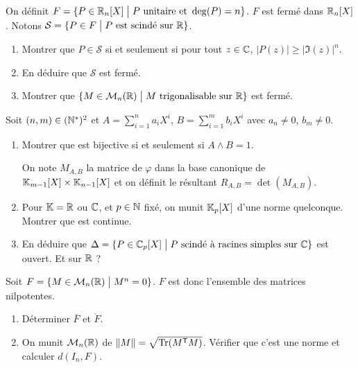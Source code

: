 \documentclass[12pt]{article}
\begin{document}
\begin{exercise}
	On définit $F=\{P\in\mathbb{R}_n[X]\bigm| P\text{ unitaire et }\deg(P)=n\}$. $F$ est fermé dans $\mathbb{R}_{n}[X]$. Notons $\mathcal{S}=\{P\in F\bigm| P\text{ est scindé sur }\mathbb{R}\}$.
	\begin{enumerate}
		\item Montrer que $P\in\mathcal{S}$ si et seulement si pour tout $z\in\mathbb{C}$, $\vert P(z)\vert\geqslant \vert\Im(z)\vert^{n}$.
		\item En déduire que $\mathcal{S}$ est fermé.
		\item Montrer que $\{M\in\mathcal{M}_{n}(\mathbb{R})\bigm| M\text{ trigonalisable sur }\mathbb{R}\}$ est fermé.
	\end{enumerate}
\end{exercise}

\begin{exercise}
	Soit $(n,m)\in(\mathbb{N}^{*})^{2}$ et $A=\sum_{i=1}^{n}a_{i}X^{i}$, $B=\sum_{i=1}^{m}b_{i}X^{i}$ avec $a_{n}\neq 0$, $b_{m}\neq0$.
	\begin{enumerate}
		\item Montrer que 
		est bijective si et seulement si $A\wedge B=1$.

		On note $M_{A,B}$ la matrice de $\varphi$ dans la base canonique de $\mathbb{K}_{m-1}[X]\times\mathbb{K}_{n-1}[X]$ et on définit le résultant $R_{A,B}=\det(M_{A,B})$.
		\item Pour $\mathbb{K}=\mathbb{R}$ ou $\mathbb{C}$, et $p\in\mathbb{N}$ fixé, on munit $\mathbb{K}_{p}[X]$ d'une norme quelconque. Montrer que 
		est continue.
		\item En déduire que $\Delta=\{P\in\mathbb{C}_{p}[X]\bigm| P\text{ scindé à racines simples sur }\mathbb{C}\}$ est ouvert. Et sur $\mathbb{R}$ ?
	\end{enumerate}
\end{exercise}

\begin{exercise}
	Soit $F=\{M\in\mathcal{M}_{n}(\mathbb{R})\bigm|M^{n}=0\}$. $F$ est donc l'ensemble des matrices nilpotentes.
	\begin{enumerate}
		\item Déterminer $\overline{F}$ et $\mathring{F}$.
		\item On munit $\mathcal{M}_{n}(\mathbb{R})$ de $\Vert M\Vert=\sqrt{\operatorname{Tr}(M^{\mathsf{T}}M)}$. Vérifier que c'est une norme et calculer $d(I_{n},F)$.
	\end{enumerate}
\end{exercise}
\end{document}
